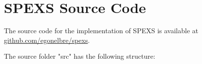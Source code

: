 \chapter{SPEXS Source Code}
\label{add:files}

The source code for the implementation of SPEXS is available at \url{github.com/egonelbre/spexs}.

The source folder "src" has the following structure:

%
